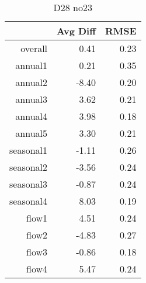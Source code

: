 \begin{table}[H]
\centering
\begin{tabular}{rrr}
  \hline
 & Avg Diff & RMSE \\ 
  \hline
overall & 0.41 & 0.23 \\ 
  annual1 & 0.21 & 0.35 \\ 
  annual2 & -8.40 & 0.20 \\ 
  annual3 & 3.62 & 0.21 \\ 
  annual4 & 3.98 & 0.18 \\ 
  annual5 & 3.30 & 0.21 \\ 
  seasonal1 & -1.11 & 0.26 \\ 
  seasonal2 & -3.56 & 0.24 \\ 
  seasonal3 & -0.87 & 0.24 \\ 
  seasonal4 & 8.03 & 0.19 \\ 
  flow1 & 4.51 & 0.24 \\ 
  flow2 & -4.83 & 0.27 \\ 
  flow3 & -0.86 & 0.18 \\ 
  flow4 & 5.47 & 0.24 \\ 
   \hline
\end{tabular}
\caption{D28 no23} 
\end{table}
